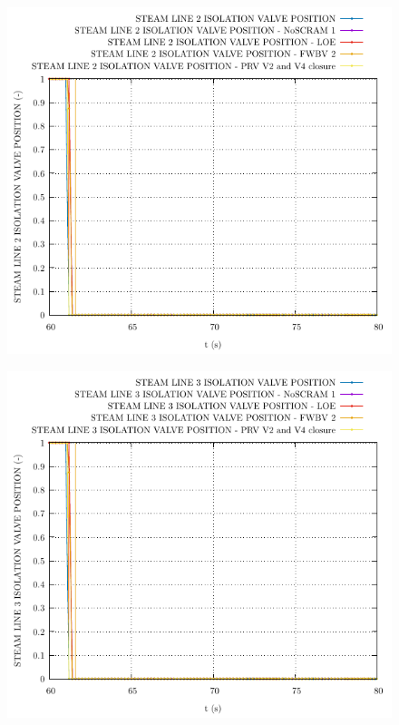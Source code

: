 \documentclass{article}
\begin{document}
\begin{multicols}{2}
\begin{figure}[H]
\includegraphics[width=\linewidth]{./graphs/STEAM LINE 2 ISOLATION VALVE POSITION.pdf}
\end{figure}
\begin{figure}[H]
\centering
\includegraphics[width=\linewidth]{./graphs/STEAM LINE 3 ISOLATION VALVE POSITION.pdf}
\end{figure}
\begin{figure}[H]

\end{figure}
\end{multicols}
\end{document}
